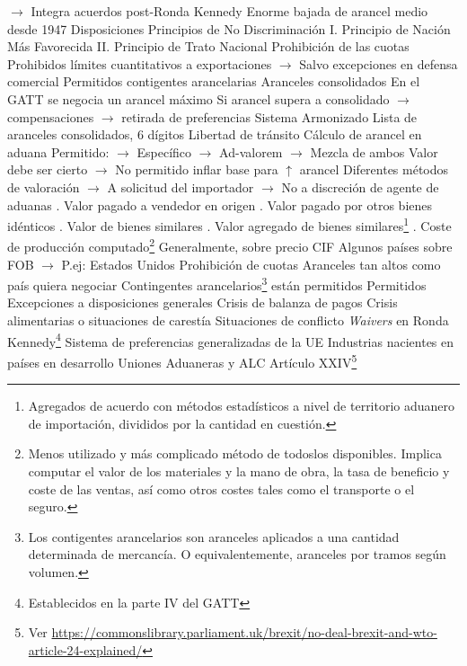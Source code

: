 \documentclass{nuevotema}
\begin{document}
\begin{esquemal}
				\4[] $\to$ Integra acuerdos post-Ronda Kennedy
				\4[] Enorme bajada de arancel medio desde 1947
			\3 Disposiciones
				\4 Principios de No Discriminación
				\4[] I. Principio de Nación Más Favorecida
				\4[] II. Principio de Trato Nacional
				\4 Prohibición de las cuotas
				\4[] Prohibidos límites cuantitativos a exportaciones
				\4[] $\to$ Salvo excepciones en defensa comercial
				\4[] Permitidos contigentes arancelarias
				\4 Aranceles consolidados
				\4[] En el GATT se negocia un arancel máximo
				\4[] Si arancel supera a consolidado
				\4[] $\to$ compensaciones
				\4[] $\to$ retirada de preferencias
				\4 Sistema Armonizado
				\4[] Lista de aranceles consolidados, 6 dígitos
				\4 Libertad de tránsito
				\4 Cálculo de arancel en aduana
				\4[] Permitido:
				\4[] $\to$ Específico
				\4[] $\to$ Ad-valorem
				\4[] $\to$ Mezcla de ambos
				\4[] Valor debe ser cierto
				\4[] $\to$ No permitido inflar base para $\uparrow$ arancel
				\4[] Diferentes métodos de valoración
				\4[] $\to$ A solicitud del importador
				\4[] $\to$ No a discreción de agente de aduanas
				. Valor pagado a vendedor en origen
				. Valor pagado por otros bienes idénticos
				. Valor de bienes similares
				. Valor agregado de bienes similares\footnote{Agregados de acuerdo con métodos estadísticos a nivel de territorio aduanero de importación, divididos por la cantidad en cuestión.}
				. Coste de producción computado\footnote{Menos utilizado y más complicado método de todoslos disponibles. Implica computar el valor de los materiales y la mano de obra, la tasa de beneficio y coste de las ventas, así como otros costes tales como el transporte o el seguro. }
				\4[] Generalmente, sobre precio CIF
				\4[] Algunos países sobre FOB
				\4[] $\to$ P.ej: Estados Unidos
				\4 Prohibición de cuotas
				\4[] Aranceles tan altos como país quiera negociar
				\4 Contingentes arancelarios\footnote{Los contigentes arancelarios son aranceles aplicados a una cantidad determinada de mercancía. O equivalentemente, aranceles por tramos según volumen.} están permitidos
				\4[] Permitidos
			\3 Excepciones a disposiciones generales
				\4 Crisis de balanza de pagos
				\4 Crisis alimentarias o situaciones de carestía
				\4 Situaciones de conflicto
				\4 \textit{Waivers} en Ronda Kennedy\footnote{Establecidos en la parte IV del GATT}
				\4[] Sistema de preferencias generalizadas de la UE
				\4 Industrias nacientes en países en desarrollo
				\4 Uniones Aduaneras y ALC
				\4[] Artículo XXIV\footnote{Ver \url{https://commonslibrary.parliament.uk/brexit/no-deal-brexit-and-wto-article-24-explained/}}

\end{esquemal}
\end{document}
